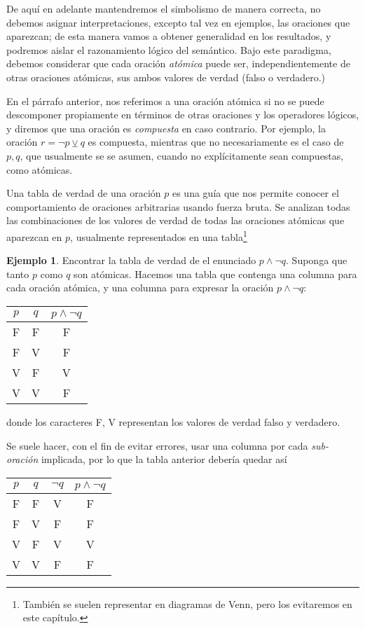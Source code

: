 \documentclass{book}
\theoremstyle{definition}
\newtheorem*{ejm}{Ejemplo}
\begin{document}
De aquí en adelante mantendremos el simbolismo de manera correcta, no debemos asignar interpretaciones, excepto tal vez en ejemplos, las oraciones que aparezcan; de esta manera vamos a obtener generalidad en los resultados, y podremos aislar el razonamiento lógico del semántico.
Bajo este paradigma, debemos considerar que cada oración \emph{atómica} puede ser, independientemente de otras oraciones atómicas, sus ambos valores de verdad (falso o verdadero.)

En el párrafo anterior, nos referimos a una oración atómica si no se puede descomponer propiamente en términos de otras oraciones y los operadores lógicos, y diremos que una oración es \emph{compuesta} en caso contrario.
Por ejemplo, la oración $r = \neg p \veebar q$ es compuesta, mientras que no necesariamente es el caso de $p,q$, que usualmente se se asumen, cuando no explícitamente sean compuestas, como atómicas.

Una tabla de verdad de una oración $p$ es una guía que nos permite conocer el comportamiento de oraciones arbitrarias usando fuerza bruta.
Se analizan todas las combinaciones de los valores de verdad de todas las oraciones atómicas que aparezcan en $p$, usualmente representados en una tabla\footnote{También se suelen representar en diagramas de Venn, pero los evitaremos en este capítulo.}
\begin{ejm}
	Encontrar la tabla de verdad de el enunciado $p \wedge \neg q$. Suponga que tanto $p$ como $q$ son atómicas.
	Hacemos una tabla que contenga una columna para cada oración atómica, y una columna para expresar la oración $p \wedge \neg q$:

	\begin{center}\begin{tabular}{|c|c|c|}
		\hline
		$p$& $q$ & $p \wedge \neg q$ \\
		\hline \hline
		F & F & F \\
		\hline
		F & V & F \\
		\hline
		V & F & V \\
		\hline
		V & V & F \\
		\hline
	\end{tabular}\end{center}
	donde los caracteres F, V representan los valores de verdad falso y verdadero.
	
	Se suele hacer, con el fin de evitar errores, usar una columna por cada \emph{sub-oración} implicada, por lo que la tabla anterior debería quedar así
	\begin{center}\begin{tabular}{|c|c|c|c|}
		\hline
		$p$& $q$ & $\neg q$ &$p \wedge \neg q$ \\
		\hline \hline
		F & F & V & F \\
		\hline
		F & V & F & F \\
		\hline
		V & F & V & V \\
		\hline
		V & V & F & F \\
		\hline
\end{tabular}\end{center} 
\end{ejm}
\end{document}
